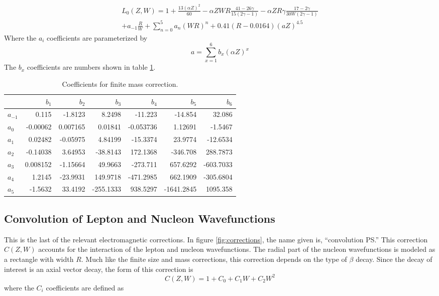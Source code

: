 \documentclass[../MaxHughesThesis.tex]{subfiles}
\begin{document}
\begin{equation}
	\label{eq:finitesize}
	\begin{split}
	L_{0}(Z,W) = 1 + \frac{13(\alpha Z)^{2}}{60} - \alpha Z W R \frac{41 - 26\gamma}{15(2\gamma - 1)} - \alpha Z R \gamma \frac{17 - 2\gamma}{30W(2\gamma - 1)}  \\
	+ a_{-1} \frac{R}{W} + \sum_{n=0}^{5} a_{n} (W R)^{n} + 0.41(R - 0.0164)(a Z)^{4.5}
	\end{split}
\end{equation}
Where the $a_{i}$ coefficients are parameterized by %
\begin{equation}
	a = \sum_{x = 1}^{6} b_{x} (\alpha Z)^{x}
	\label{eq:A}
\end{equation}
The $b_{x}$ coefficients are numbers shown in table \ref{tab:bcoef}.

\begin{table}[!hbt]
	\centering
	\caption{Coefficients for finite mass correction.}
		\begin{tabular}{lrrrrrr}
		         & $b_{1}$ & $b_{2}$ & $b_{3}$ & $b_{4}$ & $b_{5}$ & $b_{6}$ \\ \hline
		$a_{-1}$ & 0.115 & -1.8123 & 8.2498 & -11.223 & -14.854 & 32.086 \\
		$a_{0}$  & -0.00062 & 0.007165 & 0.01841 & -0.053736 & 1.12691 & -1.5467 \\
		$a_{1}$  & 0.02482 & -0.05975 & 4.84199 & -15.3374 & 23.9774 & -12.6534 \\
		$a_{2}$  & -0.14038 & 3.64953 & -38.8143 & 172.1368 & -346.708 & 288.7873 \\
		$a_{3}$  & 0.008152 & -1.15664 & 49.9663 & -273.711 & 657.6292 & -603.7033 \\
		$a_{4}$  & 1.2145 & -23.9931 & 149.9718 & -471.2985 & 662.1909 & -305.6804 \\
		$a_{5}$  & -1.5632 & 33.4192 & -255.1333 & 938.5297 & -1641.2845 & 1095.358 
		\end{tabular}
	\label{tab:bcoef}
\end{table}

\subsection{Convolution of Lepton and Nucleon Wavefunctions}

This is the last of the relevant electromagnetic corrections.
In figure \ref{fig:corrections}, the name given is, ``convolution PS.''
This correction $C(Z,W)$ accounts for the interaction of the lepton and nucleon wavefunctions. 
The radial part of the nucleon wavefunctions is  modeled as a rectangle with width $R$.
Much like the finite size and mass corrections, this correction depends on the type of $\beta$ decay.
Since the decay of interest is an axial vector decay, the form of this correction is %
\begin{equation}
	C(Z,W) = 1 + C_{0} + C_{1} W + C_{2} W^{2}
	\label{eq:nucandlepconv}
\end{equation}
where the $C_{i}$ coefficients are defined as \cite{WIL90} %
\end{document}
